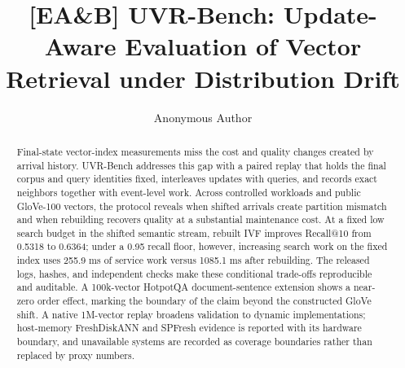 \documentclass[sigconf]{acmart}
\begin{document}

\title{[EA\&B] UVR-Bench: Update-Aware Evaluation of Vector Retrieval under Distribution Drift}

\author{Anonymous Author}



\renewcommand{\shortauthors}{Anonymous Author}

\begin{abstract}
Final-state vector-index measurements miss the cost and quality changes created by
arrival history. UVR-Bench addresses this gap with a paired replay that holds the final
corpus and query identities fixed, interleaves updates with queries, and records exact
neighbors together with event-level work. Across controlled workloads and public
GloVe-100 vectors, the protocol reveals when shifted arrivals create partition mismatch
and when rebuilding recovers quality at a substantial maintenance cost. At a fixed low
search budget in the shifted semantic stream, rebuilt IVF improves Recall@10 from
0.5318 to 0.6364; under a 0.95 recall floor, however, increasing search work on the
fixed index uses 255.9 ms of service work versus 1085.1 ms after rebuilding. The
released logs, hashes, and independent checks make these conditional trade-offs
reproducible and auditable. A 100k-vector HotpotQA document-sentence extension shows a
near-zero order effect, marking the boundary of the claim beyond the constructed GloVe
shift. A native 1M-vector replay broadens validation to dynamic implementations;
host-memory FreshDiskANN and SPFresh evidence is reported with its hardware boundary,
and unavailable systems are recorded as coverage boundaries rather than replaced by
proxy numbers.
\end{abstract}
\end{document}

